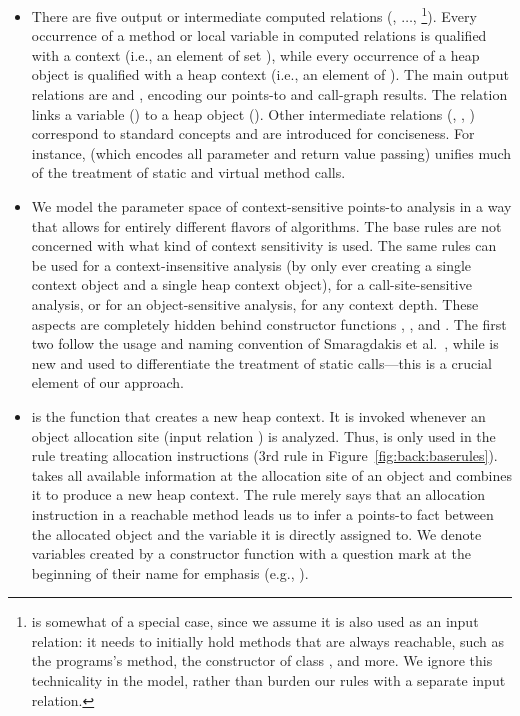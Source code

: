 \begin{itemize}
\item There are five output or intermediate computed relations (, $\ldots$, \footnote{ is somewhat of a special case, since we assume it is also used as an input relation: it needs to initially hold methods that are always reachable, such as the programs's  method, the constructor of class , and more. We ignore this technicality in the model, rather than burden our rules with a separate input relation.}). Every occurrence of a method or local variable in computed relations is qualified with a context (i.e., an element of set ), while every occurrence of a heap object is qualified with a heap context (i.e., an element of ). The main output relations are  and \relname{}, encoding our points-to and call-graph results. The  relation links a variable () to a heap object (). Other intermediate relations (, , ) correspond to standard concepts and are introduced for conciseness. For instance,  (which encodes all parameter and return value passing) unifies much of the treatment of static and virtual method calls.

\item We model the parameter space of context-sensitive points-to analysis in a way that allows for entirely different flavors of algorithms. The base rules are not concerned with what kind of context sensitivity is used. The same rules can be used for a context-insensitive analysis (by only ever creating a single context object and a single heap context object), for a call-site-sensitive analysis, or for an object-sensitive analysis, for any context depth. These aspects are completely hidden behind constructor functions , , and . The first two follow the usage and naming convention of Smaragdakis et al.~\cite{popl:2011:Smaragdakis}, while  is new and used to differentiate the treatment of static calls---this is a crucial element of our approach.

\item {} is the function that creates a new heap context. It is invoked whenever an object allocation site (input relation ) is analyzed. Thus,  is only used in the rule treating allocation instructions (3rd rule in Figure~\ref{fig:back:baserules}).  takes all available information at the allocation site of an object and combines it to produce a new heap context. The rule merely says that an allocation instruction in a reachable method leads us to infer a points-to fact between the allocated object and the variable it is directly assigned to. We denote variables created by a constructor function with a question mark at the beginning of their name for emphasis (e.g., ).


\end{itemize}
